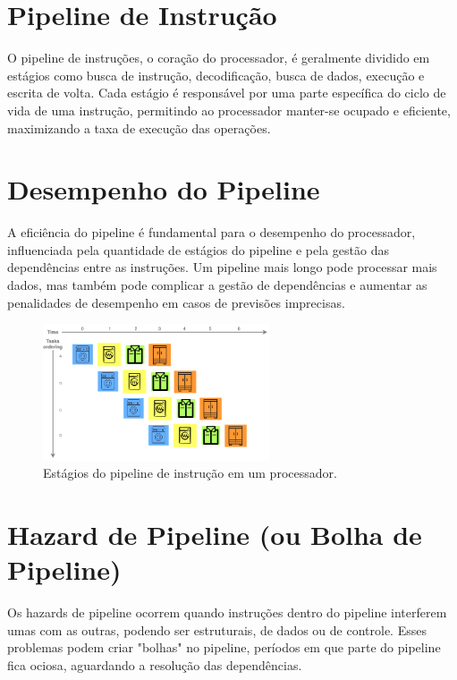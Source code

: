 \documentclass[12pt]{article}
\begin{document}
\section*{Pipeline de Instrução}

O pipeline de instruções, o coração do processador, é geralmente dividido em estágios como busca de instrução, decodificação, busca de dados, execução e escrita de volta. Cada estágio é responsável por uma parte específica do ciclo de vida de uma instrução, permitindo ao processador manter-se ocupado e eficiente, maximizando a taxa de execução das operações.


\section*{Desempenho do Pipeline}

A eficiência do pipeline é fundamental para o desempenho do processador, influenciada pela quantidade de estágios do pipeline e pela gestão das dependências entre as instruções. Um pipeline mais longo pode processar mais dados, mas também pode complicar a gestão de dependências e aumentar as penalidades de desempenho em casos de previsões imprecisas.

\begin{figure}[h]
\centering
\includegraphics[width=0.6\textwidth]{fig3.png}
\caption{Estágios do pipeline de instrução em um processador.}
\label{fig:pipeline_instrucao}
\end{figure}

\section*{Hazard de Pipeline (ou Bolha de Pipeline)}

Os hazards de pipeline ocorrem quando instruções dentro do pipeline interferem umas com as outras, podendo ser estruturais, de dados ou de controle. Esses problemas podem criar "bolhas" no pipeline, períodos em que parte do pipeline fica ociosa, aguardando a resolução das dependências.
\end{document}
